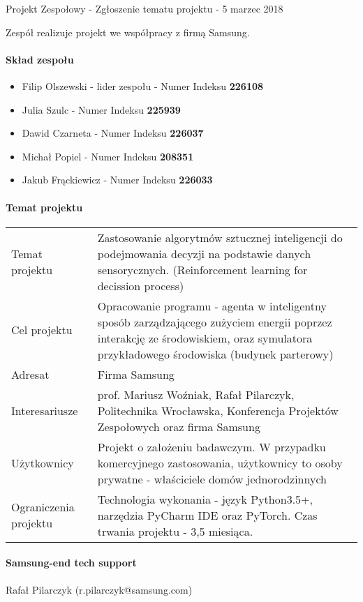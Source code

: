 \documentclass{article}
\begin{document}
\begin{center}
Projekt Zespołowy - Zgłoszenie tematu projektu - 5 marzec 2018
\end{center}

Zespół realizuje projekt we współpracy z firmą Samsung.

\paragraph{Skład zespołu}
\begin{itemize}
\item Filip Olszewski - lider zespołu - Numer Indeksu \textbf{226108}
\item Julia Szulc - Numer Indeksu \textbf{225939}
\item Dawid Czarneta - Numer Indeksu \textbf{226037}
\item Michał Popiel - Numer Indeksu \textbf{208351}
\item Jakub Frąckiewicz - Numer Indeksu \textbf{226033}
\end{itemize}

\paragraph{Temat projektu}

\begin{center}
{\def\arraystretch{1.5}\tabcolsep=6pt
	\begin{tabular}{l p{10cm}} 
	Temat projektu& Zastosowanie algorytmów sztucznej inteligencji do podejmowania decyzji na podstawie danych sensorycznych. (Reinforcement learning for decission process)\\
	Cel projektu& Opracowanie programu - agenta w inteligentny sposób zarządzającego zużyciem energii poprzez interakcję ze środowiskiem, oraz symulatora przykładowego środowiska (budynek parterowy)\\
	Adresat& Firma Samsung\\
	Interesariusze& prof. Mariusz Woźniak, Rafał Pilarczyk, Politechnika Wrocławska, Konferencja Projektów Zespołowych oraz firma Samsung\\
	Użytkownicy& Projekt o założeniu badawczym. W przypadku komercyjnego zastosowania, użytkownicy to osoby prywatne - właściciele domów jednorodzinnych\\
	Ograniczenia projektu&Technologia wykonania - język Python3.5+, narzędzia PyCharm IDE oraz PyTorch. Czas trwania projektu - 3,5 miesiąca.\\

\end{tabular}}
\end{center}


\paragraph{Samsung-end tech support}
Rafał Pilarczyk (r.pilarczyk@samsung.com)
\end{document}
